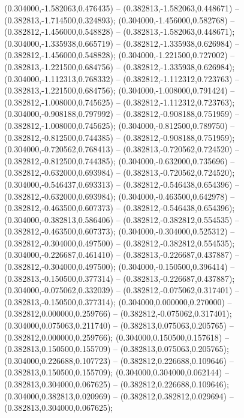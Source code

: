  (0.304000,-1.582063,0.476435) -- (0.382813,-1.582063,0.448671) -- (0.382813,-1.714500,0.324893);
 (0.304000,-1.456000,0.582768) -- (0.382812,-1.456000,0.548828) -- (0.382813,-1.582063,0.448671);
 (0.304000,-1.335938,0.665719) -- (0.382812,-1.335938,0.626984) -- (0.382812,-1.456000,0.548828);
 (0.304000,-1.221500,0.727002) -- (0.382813,-1.221500,0.684756) -- (0.382812,-1.335938,0.626984);
 (0.304000,-1.112313,0.768332) -- (0.382812,-1.112312,0.723763) -- (0.382813,-1.221500,0.684756);
 (0.304000,-1.008000,0.791424) -- (0.382812,-1.008000,0.745625) -- (0.382812,-1.112312,0.723763);
 (0.304000,-0.908188,0.797992) -- (0.382812,-0.908188,0.751959) -- (0.382812,-1.008000,0.745625);
 (0.304000,-0.812500,0.789750) -- (0.382812,-0.812500,0.744385) -- (0.382812,-0.908188,0.751959);
 (0.304000,-0.720562,0.768413) -- (0.382813,-0.720562,0.724520) -- (0.382812,-0.812500,0.744385);
 (0.304000,-0.632000,0.735696) -- (0.382812,-0.632000,0.693984) -- (0.382813,-0.720562,0.724520);
 (0.304000,-0.546437,0.693313) -- (0.382812,-0.546438,0.654396) -- (0.382812,-0.632000,0.693984);
 (0.304000,-0.463500,0.642978) -- (0.382812,-0.463500,0.607373) -- (0.382812,-0.546438,0.654396);
 (0.304000,-0.382813,0.586406) -- (0.382812,-0.382812,0.554535) -- (0.382812,-0.463500,0.607373);
 (0.304000,-0.304000,0.525312) -- (0.382812,-0.304000,0.497500) -- (0.382812,-0.382812,0.554535);
 (0.304000,-0.226687,0.461410) -- (0.382813,-0.226687,0.437887) -- (0.382812,-0.304000,0.497500);
 (0.304000,-0.150500,0.396414) -- (0.382813,-0.150500,0.377314) -- (0.382813,-0.226687,0.437887);
 (0.304000,-0.075062,0.332039) -- (0.382812,-0.075062,0.317401) -- (0.382813,-0.150500,0.377314);
 (0.304000,0.000000,0.270000) -- (0.382812,0.000000,0.259766) -- (0.382812,-0.075062,0.317401);
 (0.304000,0.075063,0.211740) -- (0.382813,0.075063,0.205765) -- (0.382812,0.000000,0.259766);
 (0.304000,0.150500,0.157618) -- (0.382813,0.150500,0.155709) -- (0.382813,0.075063,0.205765);
 (0.304000,0.226688,0.107723) -- (0.382812,0.226688,0.109646) -- (0.382813,0.150500,0.155709);
 (0.304000,0.304000,0.062144) -- (0.382813,0.304000,0.067625) -- (0.382812,0.226688,0.109646);
 (0.304000,0.382813,0.020969) -- (0.382812,0.382812,0.029694) -- (0.382813,0.304000,0.067625);
